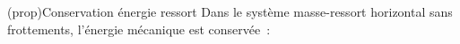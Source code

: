 \documentclass[../../main/main.tex]{subfiles}
\begin{document}
	\begin{tcb*}[label=prop:emecacons, sidebyside, righthand ratio=.3]
    (prop){Conservation énergie ressort}
		Dans le système masse-ressort horizontal sans frottements, l'énergie
		mécanique est conservée~:
		\psw{%
			\[
				\boxed{\Ec_m = \cte}
				\Lra
				\boxed{\dv{\Ec_m}{t} = 0}
			\]
		}%
		\vspace{-15pt}
    \tcblower
		\begin{center}
		\end{center}
	\end{tcb*}
\end{document}
